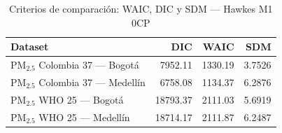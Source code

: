 \begin{table}[htbp]
\centering
\caption{Criterios de comparaci\'{o}n: WAIC, DIC y SDM --- Hawkes M1 0CP}
\label{tab:hawkes_criterios_0cp}
\begin{tabular}{lrrr}
\toprule
Dataset & DIC & WAIC & SDM \\
\midrule
PM$_{2.5}$ Colombia 37 --- Bogot\'{a} & 7952.11 & 1330.19 & 3.7526 \\
PM$_{2.5}$ Colombia 37 --- Medell\'{i}n & 6758.08 & 1134.37 & 6.2876 \\
PM$_{2.5}$ WHO 25 --- Bogot\'{a} & 18793.37 & 2111.03 & 5.6919 \\
PM$_{2.5}$ WHO 25 --- Medell\'{i}n & 18714.17 & 2111.87 & 6.2487 \\
\bottomrule
\end{tabular}
\end{table}
